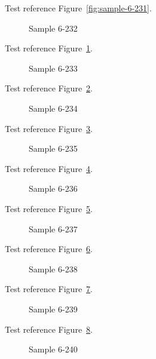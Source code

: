 Test reference Figure~\ref{fig:sample-6-231}.

\begin{figure}[tbhp]
\caption{Sample 6-232}
\label{fig:sample-6-232}
\end{figure}

Test reference Figure~\ref{fig:sample-6-232}.

\begin{figure}[tbhp]
\caption{Sample 6-233}
\label{fig:sample-6-233}
\end{figure}

Test reference Figure~\ref{fig:sample-6-233}.

\begin{figure}[tbhp]
\caption{Sample 6-234}
\label{fig:sample-6-234}
\end{figure}

Test reference Figure~\ref{fig:sample-6-234}.

\begin{figure}[tbhp]
\caption{Sample 6-235}
\label{fig:sample-6-235}
\end{figure}

Test reference Figure~\ref{fig:sample-6-235}.

\begin{figure}[tbhp]
\caption{Sample 6-236}
\label{fig:sample-6-236}
\end{figure}

Test reference Figure~\ref{fig:sample-6-236}.

\begin{figure}[tbhp]
\caption{Sample 6-237}
\label{fig:sample-6-237}
\end{figure}

Test reference Figure~\ref{fig:sample-6-237}.

\begin{figure}[tbhp]
\caption{Sample 6-238}
\label{fig:sample-6-238}
\end{figure}

Test reference Figure~\ref{fig:sample-6-238}.

\begin{figure}[tbhp]
\caption{Sample 6-239}
\label{fig:sample-6-239}
\end{figure}

Test reference Figure~\ref{fig:sample-6-239}.

\begin{figure}[tbhp]
\caption{Sample 6-240}
\label{fig:sample-6-240}
\end{figure}

